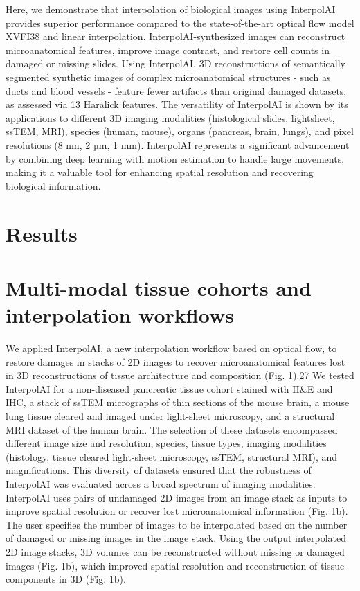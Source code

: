 \begin{refsection}
    Here, we demonstrate that interpolation of biological images using InterpolAI provides superior performance compared to the state-of-the-art optical flow model XVFI38 and linear interpolation. InterpolAI-synthesized images can reconstruct microanatomical features, improve image contrast, and restore cell counts in damaged or missing slides. Using InterpolAI, 3D reconstructions of semantically segmented synthetic images of complex microanatomical structures - such as ducts and blood vessels - feature fewer artifacts than original damaged datasets, as assessed via 13 Haralick features. The versatility of InterpolAI is shown by its applications to different 3D imaging modalities (histological slides, lightsheet, ssTEM, MRI), species (human, mouse), organs (pancreas, brain, lungs), and pixel resolutions (8 nm, 2 µm, 1 mm). InterpolAI represents a significant advancement by combining deep learning with motion estimation to handle large movements, making it a valuable tool for enhancing spatial resolution and recovering biological information.
    
    \section{Results}
    \section{Multi-modal tissue cohorts and interpolation workflows}
    We applied InterpolAI, a new interpolation workflow based on optical flow, to restore damages in stacks of 2D images to recover microanatomical features lost in 3D reconstructions of tissue architecture and composition (Fig. 1).27 We tested InterpolAI for a non-diseased pancreatic tissue cohort stained with H\&E and IHC, a stack of ssTEM micrographs of thin sections of the mouse brain, a mouse lung tissue cleared and imaged under light-sheet microscopy, and a structural MRI dataset of the human brain. The selection of these datasets encompassed different image size and resolution, species, tissue types, imaging modalities (histology, tissue cleared light-sheet microscopy, ssTEM, structural MRI), and magnifications. This diversity of datasets ensured that the robustness of InterpolAI was evaluated across a broad spectrum of imaging modalities.
    InterpolAI uses pairs of undamaged 2D images from an image stack as inputs to improve spatial resolution or recover lost microanatomical information (Fig. 1b). The user specifies the number of images to be interpolated based on the number of damaged or missing images in the image stack. Using the output interpolated 2D image stacks, 3D volumes can be reconstructed without missing or damaged images (Fig. 1b), which improved spatial resolution and reconstruction of tissue components in 3D (Fig. 1b). 
    

\end{refsection}
